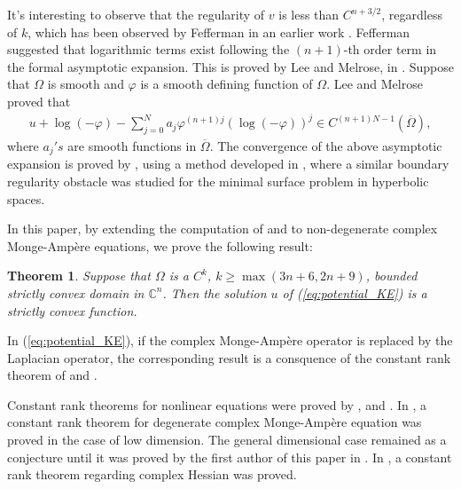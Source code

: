 \documentclass{article}
\newtheorem{theorem}{Theorem}[section]
\numberwithin{equation}{section}
\newcommand{\EC}{\mathbb{C}}
\begin{document}
It's interesting to observe that the regularity of $v$ is less than $C^{n+3/2}$, regardless of $k$, which has been observed by Fefferman in an earlier work \cite{Fefferman1976Ann}. Fefferman suggested that logarithmic terms exist following the $(n+1)$-th order term in the formal asymptotic expansion. This is proved by Lee and Melrose, in \cite{Lee_Melrose_Acta}. Suppose that $\Omega$ is smooth and $\varphi$ is a smooth defining function of $\Omega$. Lee and Melrose proved that
\begin{align}
	u+\log(-\varphi)-\sum_{j=0}^N a_j \varphi^{(n+1)j}(\log(-\varphi))^j\in C^{(n+1)N-1}(\overline{\Omega}),
\end{align}where ${a_j}'s$ are smooth functions in $\overline\Omega$.
The convergence of the above asymptotic expansion is proved by \cite{Han_Jiang_Expansion}, using a method developed in \cite{HanJiang_MinimalSurface}, where a similar boundary regularity obstacle was studied for the minimal surface problem in hyperbolic spaces.

In this paper, by extending the computation of \cite{Hu22Nov} and \cite{HuCConvexity} to non-degenerate complex Monge-Amp\`ere equations, we prove the following result:
\begin{theorem}
	Suppose that $\Omega$ is a $C^k$, $k\geq \max(3n+6,2n+9)$, bounded strictly convex domain in $\EC^n$. Then the solution $u$ of  (\ref{eq:potential_KE}) is a strictly convex function.
\end{theorem}

In (\ref{eq:potential_KE}), if the complex Monge-Amp\`ere operator is replaced by the Laplacian operator, the corresponding result is a consquence of the constant rank theorem of \cite{CaffarelliDuke1985} and \cite{Korevaar_Lewis}.  

Constant rank theorems for nonlinear equations were proved by \cite{Caffarelli_Guan_Ma_constantrank}, \cite{BianGuan09_Invention} and \cite{Garbo_Weinkove_ConstantRank}. In \cite{GuanPhong12MaxRank}, a constant rank theorem for degenerate complex Monge-Amp\`ere equation was proved in the case of low dimension. The general dimensional case remained as a conjecture until it was proved by the first author of this paper in \cite{Hu22Nov}.  In \cite{LQun_Complex}, a constant rank theorem regarding complex Hessian was proved.
\end{document}
